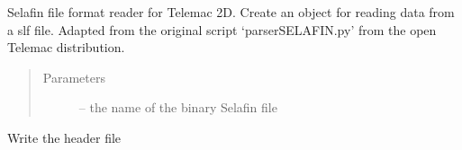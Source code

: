 \documentclass[letterpaper,10pt,english]{sphinxmanual}
\begin{document}
\begin{fulllineitems}
\label{\detokenize{index:src.selafin_habby1.Selafin}}
Selafin file format reader for Telemac 2D. Create an object for reading data from a slf file.
Adapted from the original script `parserSELAFIN.py' from the open Telemac distribution.
\begin{quote}\begin{description}
\item[{Parameters}] \leavevmode
{} -- the name of the binary Selafin file

\end{description}\end{quote}

\begin{fulllineitems}
\label{\detokenize{index:src.selafin_habby1.Selafin.addcontent}}
\end{fulllineitems}


\begin{fulllineitems}
\label{\detokenize{index:src.selafin_habby1.Selafin.appendcoretimeslf}}
\end{fulllineitems}


\begin{fulllineitems}
\label{\detokenize{index:src.selafin_habby1.Selafin.appendcorevarsslf}}
\end{fulllineitems}


\begin{fulllineitems}
\label{\detokenize{index:src.selafin_habby1.Selafin.appendheaderslf}}
Write the header file

\end{fulllineitems}


\end{fulllineitems}
\end{document}
